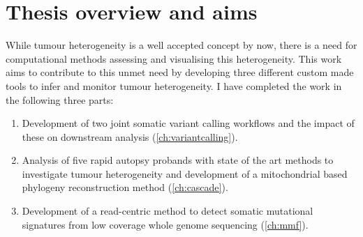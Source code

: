 \section{Thesis overview and aims}
\label{intro-sec:overview}

While tumour heterogeneity is a well accepted concept by now, there is a need for computational methods assessing and visualising this heterogeneity. This work aims to contribute to this unmet need by developing three different custom made tools to infer and monitor tumour heterogeneity. I have completed the work in the following three parts:

\begin{enumerate}
	\item Development of two joint somatic variant calling workflows and the impact of these on downstream analysis (\autoref{ch:variantcalling}). 
	\item Analysis of five rapid autopsy probands with state of the art methods to investigate tumour heterogeneity and development of a mitochondrial based phylogeny reconstruction method (\autoref{ch:cascade}). 
	\item Development of a read-centric method to detect somatic mutational signatures from low coverage whole genome sequencing (\autoref{ch:mmf}).
\end{enumerate}